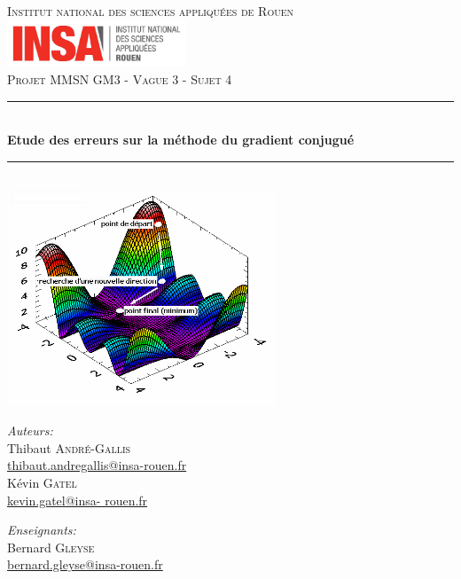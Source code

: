 \documentclass[12,french]{report}
\newcommand{\HRule}{\rule{\linewidth}{0.5mm}}
\begin{document}
\hypersetup{pdfborder=0 0 0}

\begin{titlepage}

\begin{center}
	\textsc{\LARGE Institut national des sciences appliquées de Rouen} 
	\vspace{5mm}\\
	\includegraphics[width=0.4\textwidth]{./Images/insa}\\[1.0 cm]

	\textsc{\Large Projet MMSN GM3 - Vague 3 - Sujet 4}\\[0.6cm]

	\HRule \\[0.5cm]
	{ \Huge \bfseries Etude des erreurs sur la méthode du gradient conjugué}\\[0.2cm]
	\HRule \\[0.75cm]

	\includegraphics[width=0.6\textwidth]{./Images/Page_de_garde}\\[0.9 cm]

	\begin{minipage}{0.4\textwidth}
		\begin{flushleft} \large
			\emph{Auteurs:}\\
			Thibaut \textsc{André-Gallis} \\
			{\small\href{mailto:thibaut.andregallis@insa-rouen.fr}{thibaut.andregallis@insa-rouen.fr}} \\
			Kévin \textsc{Gatel} \\
			{\small\href{mailto:kevin.gatel@insa-rouen.fr}{kevin.gatel@insa-				rouen.fr}}
		\end{flushleft}
	\end{minipage}
	\begin{minipage}{0.4\textwidth}
		\begin{flushright} \large
			\emph{Enseignants:} \\
			Bernard \textsc{Gleyse} \\
			{\small\href{mailto:bernard.gleyse@insa-rouen.fr}								{bernard.gleyse@insa-rouen.fr}}\\
		\end{flushright}
	\end{minipage}


\end{center}
\end{titlepage}
\end{document}
